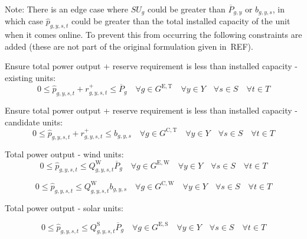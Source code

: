 \documentclass{article}
\newcommand{\sGeneratorsExistingThermal}{G^{\mathrm{E,T}}}
\newcommand{\sGeneratorsExistingWind}{G^{\mathrm{E,W}}}
\newcommand{\sGeneratorsExistingSolar}{G^{\mathrm{E,S}}}
\newcommand{\sGeneratorsCandidateThermal}{G^{\mathrm{C,T}}}
\newcommand{\sGeneratorsCandidateWind}{G^{\mathrm{C,W}}}
\newcommand{\sYears}{Y}
\newcommand{\sScenarios}{S}
\newcommand{\sIntervals}{T}
\newcommand{\iGenerator}{g}
\newcommand{\iYear}{y}
\newcommand{\iScenario}{s}
\newcommand{\iInterval}{t}
\newcommand{\cPowerOutputMax}[1][\iGenerator,\iYear]{\overline{P}_{#1}}
\newcommand{\cCapacityFactor}[1][\iGenerator,\iYear,\iScenario,\iInterval]{Q_{#1}}
\newcommand{\cRampRateStartup}[1][\iGenerator]{SU_{#1}}
\newcommand{\vReserveUp}[1][\iGenerator,\iYear,\iScenario,\iInterval]{r^{+}_{#1}}
\newcommand{\vPowerTotal}[1][\iGenerator,\iYear,\iScenario,\iInterval]{\hat{p}_{#1}}
\newcommand{\vInstalledCapacityTotalScenario}[1][\iGenerator,\iYear,\iScenario]{b_{#1}}
\begin{document}
Note: There is an edge case where $\cRampRateStartup$ could be greater than $\cPowerOutputMax$ or $\vInstalledCapacityTotalScenario$, in which case $\vPowerTotal$ could be greater than the total installed capacity of the unit when it comes online. To prevent this from occurring the following constraints are added (these are not part of the original formulation given in~REF).

Ensure total power output + reserve requirement is less than installed capacity - existing units:
\begin{equation}
	0 \leq \vPowerTotal + \vReserveUp \leq \cPowerOutputMax[\iGenerator] \quad \forall \iGenerator \in \sGeneratorsExistingThermal \quad \forall \iYear \in \sYears \quad \forall \iScenario \in \sScenarios \quad \forall \iInterval \in \sIntervals
\end{equation}

Ensure total power output + reserve requirement is less than installed capacity - candidate units:
\begin{equation}
	0 \leq \vPowerTotal + \vReserveUp \leq \vInstalledCapacityTotalScenario \quad \forall \iGenerator \in \sGeneratorsCandidateThermal \quad \forall \iYear \in \sYears \quad \forall \iScenario \in \sScenarios \quad \forall \iInterval \in \sIntervals
\end{equation}

Total power output - wind units:
\begin{equation}
0 \leq \vPowerTotal \leq \cCapacityFactor^{\mathrm{W}} \cPowerOutputMax[\iGenerator] \quad \forall \iGenerator \in \sGeneratorsExistingWind \quad \forall \iYear \in \sYears \quad \forall \iScenario \in \sScenarios \quad \forall \iInterval \in \sIntervals 
\end{equation}

\begin{equation}
0 \leq \vPowerTotal \leq \cCapacityFactor^{\mathrm{W}} \vInstalledCapacityTotalScenario \quad \forall \iGenerator \in \sGeneratorsCandidateWind \quad \forall \iYear \in \sYears \quad \forall \iScenario \in \sScenarios \quad \forall \iInterval \in \sIntervals
\end{equation}

Total power output - solar units:

\begin{equation}
0 \leq \vPowerTotal \leq \cCapacityFactor^{\mathrm{S}} \cPowerOutputMax[\iGenerator] \quad \forall \iGenerator \in \sGeneratorsExistingSolar \quad \forall \iYear \in \sYears \quad \forall \iScenario \in \sScenarios \quad \forall \iInterval \in \sIntervals 
\end{equation}
\end{document}
